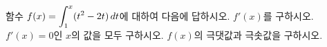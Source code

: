 함수 $f(x)=\displaystyle\int_{1}^{x} (t^2-2t)\mkern3mu dt$에 대하여 다음에 답하시오.
 $f'(x)$를 구하시오.
 $f'(x)=0$인 $x$의 값을 모두 구하시오.
 $f(x)$의 극댓값과 극솟값을 구하시오.
